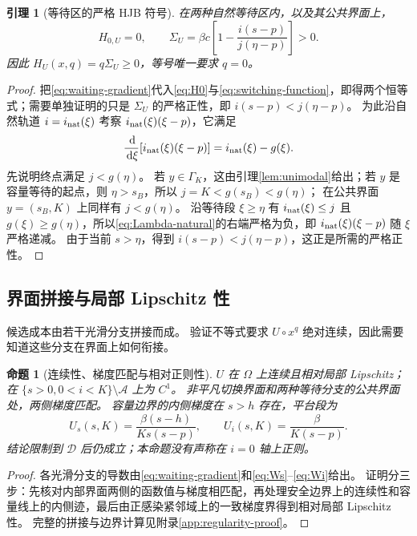 \documentclass[11pt,a4paper,UTF8]{ctexart}
\newtheorem{proposition}[theorem]{命题}
\newtheorem{lemma}[theorem]{引理}
\theoremstyle{definition}
\newcommand{\Acal}{\mathcal A}
\newcommand{\Dcal}{\mathcal D}
\newcommand{\dd}{\,\mathrm d}
\begin{document}
\begin{lemma}[等待区的严格 HJB 符号]
\label{lem:waiting-HJB}
在两种自然等待区内，以及其公共界面上，
\begin{equation}
H_{0,U}=0,\qquad
\Sigma_U=\beta c\left[1-\frac{i(s-p)}{j(\eta-p)}\right]>0.
\label{eq:waiting-HJB}
\end{equation}
因此 $H_U(x,q)=q\Sigma_U\ge0$，等号唯一要求 $q=0$。
\end{lemma}
\begin{proof}
把\eqref{eq:waiting-gradient}代入\eqref{eq:H0}与\eqref{eq:switching-function}，即得两个恒等式；需要单独证明的只是 $\Sigma_U$ 的严格正性，即 $i(s-p)<j(\eta-p)$。
为此沿自然轨道 $i=i_{\rm nat}(\xi)$ 考察 $i_{\rm nat}(\xi)(\xi-p)$，它满足
\begin{equation}
\frac{\dd}{\dd\xi}[i_{\rm nat}(\xi)(\xi-p)]=i_{\rm nat}(\xi)-g(\xi).
\label{eq:Lambda-natural}
\end{equation}
先说明终点满足 $j<g(\eta)$。
若 $y\in\Gamma_K$，这由引理\ref{lem:unimodal}给出；若 $y$ 是容量等待的起点，则 $\eta>s_B$，所以 $j=K<g(s_B)<g(\eta)$；
在公共界面 $y=(s_B,K)$ 上同样有 $j<g(\eta)$。
沿等待段 $\xi\ge\eta$ 有 $i_{\rm nat}(\xi)\le j$ 且 $g(\xi)\ge g(\eta)$，所以\eqref{eq:Lambda-natural}的右端严格为负，即 $i_{\rm nat}(\xi)(\xi-p)$ 随 $\xi$ 严格递减。
由于当前 $s>\eta$，得到 $i(s-p)<j(\eta-p)$，这正是所需的严格正性。
\end{proof}

\subsection{界面拼接与局部 Lipschitz 性}
候选成本由若干光滑分支拼接而成。
验证不等式要求 $U\circ x^q$ 绝对连续，因此需要知道这些分支在界面上如何衔接。

\begin{proposition}[连续性、梯度匹配与相对正则性]
\label{prop:regularity}
$U$ 在 $\Omega$ 上连续且相对局部 Lipschitz；在
$\{s>0,0<i<K\}\setminus\Acal$ 上为 $C^1$。
非平凡切换界面和两种等待分支的公共界面处，两侧梯度匹配。
容量边界的内侧梯度在 $s>h$ 存在，平台段为
\begin{equation}
U_s(s,K)=\frac{\beta(s-h)}{Ks(s-p)},\qquad U_i(s,K)=\frac \beta{K(s-p)}.
\label{eq:capacity-gradient}
\end{equation}
结论限制到 $\Dcal$ 后仍成立；本命题没有声称在 $i=0$ 轴上正则。
\end{proposition}
\begin{proof}
各光滑分支的导数由\eqref{eq:waiting-gradient}和\eqref{eq:Ws}--\eqref{eq:Wi}给出。
证明分三步：先核对内部界面两侧的函数值与梯度相匹配，再处理安全边界上的连续性和容量线上的内侧迹，最后由正感染紧邻域上的一致梯度界得到相对局部 Lipschitz 性。
完整的拼接与边界计算见附录\ref{app:regularity-proof}。
\end{proof}
\end{document}
